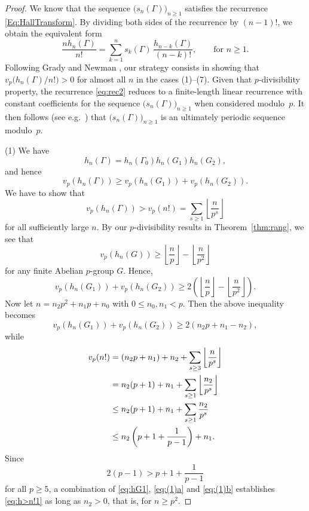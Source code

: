 \documentclass[12pt,reqno]{amsart}
\numberwithin{equation}{section}
\theoremstyle{remark}
\begin{document}
\begin{proof}
We know that the sequence $\big(s_n(\Gamma)\big)_{n\ge1}$ satisfies the
recurrence \eqref{Eq:HallTransform}. By dividing both sides of the 
recurrence by $(n-1)!$, we obtain the equivalent form
\begin{equation} \label{eq:rec2} 
\frac {nh_n(\Gamma)} {n!} = \sum_{k=1}^n  s_k(\Gamma)\,
\frac {h_{n-k}(\Gamma)} {(n-k)!},\quad \quad \text{for }n\geq1. 
\end{equation}
Following Grady and Newman \cite{GrNeAA}, our strategy consists in
showing that $v_p\big(h_n(\Gamma)/n!\big)>0$ for almost all $n$ in the cases
(1)--(7). Given that $p$-divisibility property, the recurrence
\eqref{eq:rec2} reduces to a finite-length linear recurrence with
constant coefficients
for the sequence $\big(s_n(\Gamma)\big)_{n\ge1}$ when
considered modulo~$p$. It then follows (see e.g.\ \cite[Ch.~8]{LiNie})
that $\big(s_n(\Gamma)\big)_{n\ge1}$ is an ultimately periodic
sequence modulo~$p$.

\medskip
(1) We have
$$
h_n(\Gamma)=h_n(\Gamma_0)h_n(G_1)h_n(G_2),
$$
and hence
\begin{equation} \label{eq:hG1} 
v_p\left(h_n(\Gamma)\right)\ge
v_p\left(h_n(G_1)\right)+v_p\left(h_n(G_2)\right).
\end{equation}
We have to show that 
\begin{equation} \label{eq:h>n!1} 
v_p\left(h_n(\Gamma)\right)>v_p(n!)
=\sum_{s\ge1}{\left\lfloor{\frac {n} {p^s}}\right\rfloor}
\end{equation}
for all sufficiently large $n$.
By our $p$-divisibility results in Theorem~\ref{thm:rang}, we see
that
$$
v_p\left(h_n(G)\right)\ge {\left\lfloor{\frac {n} {p}}\right\rfloor}-{\left\lfloor{\frac {n} {p^2}}\right\rfloor}
$$
for any finite Abelian $p$-group $G$. Hence, 
\begin{equation*} 
v_p\left(h_n(G_1)\right)+v_p\left(h_n(G_2)\right)
\ge 2\left({\left\lfloor{\frac {n} {p}}\right\rfloor}-{\left\lfloor{\frac {n} {p^2}}\right\rfloor}\right).
\end{equation*}
Now let $n=n_2p^2+n_1p+n_0$ with $0\le n_0,n_1<p$.
Then the above inequality becomes
\begin{equation} \label{eq:(1)a}  
v_p\left(h_n(G_1)\right)+v_p\left(h_n(G_2)\right)
\ge 2\left(n_2p+n_1-n_2\right),
\end{equation}
while
\begin{align} \notag
v_p(n!)&=(n_2p+n_1)+n_2+\sum_{s\ge3}{\left\lfloor{\frac {n} {p^s}}\right\rfloor}\\
\notag
&=n_2(p+1)+n_1+\sum_{s\ge1}{\left\lfloor{\frac {n_2} {p^s}}\right\rfloor}\\
\notag
&\le n_2(p+1)+n_1+\sum_{s\ge1}{\frac {n_2} {p^s}}\\
&\le n_2\left(p+1+\frac {1} {p-1}\right)+n_1.
\label{eq:(1)b}  
\end{align}
Since 
\begin{equation} \label{eq:pungl} 
2(p-1)> p+1+\frac {1} {p-1}
\end{equation}
for all $p\ge5$, a combination of 
\eqref{eq:hG1}, \eqref{eq:(1)a} and
\eqref{eq:(1)b} establishes \eqref{eq:h>n!1} as long as
$n_2>0$, that is, for $n\ge p^2$.


\end{proof}
\end{document}
